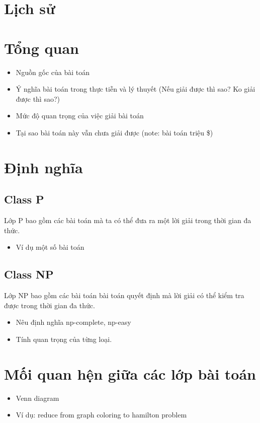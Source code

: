 \documentclass[a4paper 14pt]{extarticle}
\begin{document}
	
	\pagebreak
	
	
	\section{Lịch sử}
	\section{Tổng quan}
	\begin{itemize}
		\item Nguồn gốc của bài toán
		\item Ý nghĩa bài toán trong thực tiễn và lý thuyết (Nếu giải được thì sao? Ko giải được thì sao?)
		\item Mức độ quan trọng của việc giải bài toán
		\item Tại sao bài toán này vẫn chưa giải được (note: bài toán triệu \$)
	\end{itemize}
	
	\section{Định nghĩa}
	\subsection{Class P}
	
	Lớp P bao gồm các bài toán mà ta có thể đưa ra một lời giải trong thời gian đa thức.\\
	\begin{itemize}
		\item Ví dụ một số bài toán 
	\end{itemize}
	\subsection{Class NP}
	Lớp NP bao gồm các bài toán bài toán quyết định mà lời giải có thể kiểm tra được trong thời gian đa thức.
	\begin{itemize}
		\item Nêu định nghĩa np-complete, np-easy
		\item Tính quan trọng của từng loại.
	\end{itemize}
	
	
	\section{Mối quan hện giữa các lớp bài toán}
	\begin{itemize}
		\item Venn diagram
		\item Ví dụ: reduce from graph coloring to hamilton problem
	\end{itemize}
\end{document}
